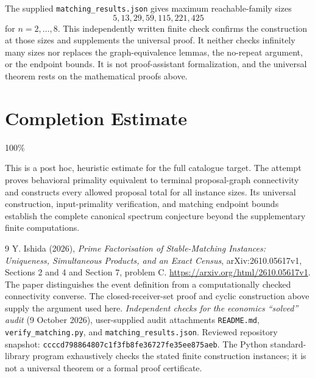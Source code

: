 \documentclass[11pt,a4paper]{article}
\begin{document}
The supplied \texttt{matching\_results.json} gives maximum reachable-family sizes
\[
 5,13,29,59,115,221,425
\]
for $n=2,\ldots,8$. This independently written finite check confirms the construction at those sizes and supplements the universal proof. It neither checks infinitely many sizes nor replaces the graph-equivalence lemmas, the no-repeat argument, or the endpoint bounds. It is not proof-assistant formalization, and the universal theorem rests on the mathematical proofs above.

\section{Completion Estimate}
100\%

This is a post hoc, heuristic estimate for the full catalogue target.
The attempt proves behavioral primality equivalent to terminal proposal-graph connectivity and constructs every allowed proposal total for all instance sizes. Its universal construction, input-primality verification, and matching endpoint bounds establish the complete canonical spectrum conjecture beyond the supplementary finite computations.

\begin{thebibliography}{9}
 Y. Ishida (2026), \emph{Prime Factorisation of Stable-Matching Instances: Uniqueness, Simultaneous Products, and an Exact Census}, arXiv:2610.05617v1, Sections 2 and 4 and Section 7, problem C. \url{https://arxiv.org/html/2610.05617v1}. The paper distinguishes the event definition from a computationally checked connectivity converse. The closed-receiver-set proof and cyclic construction above supply the argument used here.
 \emph{Independent checks for the economics ``solved'' audit} (9 October 2026), user-supplied audit attachments \texttt{README.md}, \texttt{verify\_matching.py}, and \texttt{matching\_results.json}. Reviewed repository snapshot: \texttt{ccccd798864807c1f3fb8fe36727fe35ee875aeb}. The Python standard-library program exhaustively checks the stated finite construction instances; it is not a universal theorem or a formal proof certificate.
\end{thebibliography}
\end{document}
